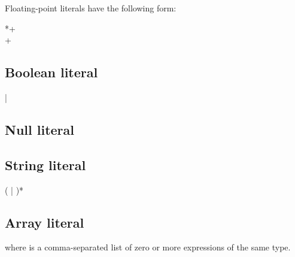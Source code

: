 Floating-point literals have the following form:

\begin{grammar}
 \textrightarrow{}  *+\\
 \textrightarrow{} +
\end{grammar}

\subsection{Boolean literal}

\begin{grammar}
 \textrightarrow{}  | 
\end{grammar}

\subsection{Null literal}

\begin{grammar}
 \textrightarrow{} 
\end{grammar}

\subsection{String literal}

\begin{grammar}
 \textrightarrow{} ( | )*\\
 \textrightarrow{} \code{\$\{}  \code{\}}
\end{grammar}

\subsection{Array literal}

\begin{grammar}
 \textrightarrow{} \code{[}  \code{]}
\end{grammar}

where  is a comma-separated list of zero or more expressions of the
same type.

